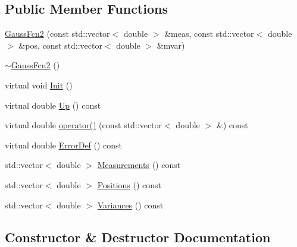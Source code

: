 \subsection*{Public Member Functions}
\begin{DoxyCompactItemize}
\item 
\mbox{\hyperlink{classROOT_1_1Minuit2_1_1GaussFcn2_a2904a79650d89e25591d84060e986271}{Gauss\+Fcn2}} (const std\+::vector$<$ double $>$ \&meas, const std\+::vector$<$ double $>$ \&pos, const std\+::vector$<$ double $>$ \&mvar)
\item 
\mbox{\hyperlink{classROOT_1_1Minuit2_1_1GaussFcn2_ab37a15b9986eab678018570c2a744799}{$\sim$\+Gauss\+Fcn2}} ()
\item 
virtual void \mbox{\hyperlink{classROOT_1_1Minuit2_1_1GaussFcn2_a4094daab77c76f30bacb299c5c3dfba4}{Init}} ()
\item 
virtual double \mbox{\hyperlink{classROOT_1_1Minuit2_1_1GaussFcn2_aef7172f9af50244bc9fce0c96cc21e81}{Up}} () const
\item 
virtual double \mbox{\hyperlink{classROOT_1_1Minuit2_1_1GaussFcn2_ad90e2fe9c9a2392c1e110a3e4679bfc3}{operator()}} (const std\+::vector$<$ double $>$ \&) const
\item 
virtual double \mbox{\hyperlink{classROOT_1_1Minuit2_1_1GaussFcn2_ac240f7b6ecbb7bf842d786e3914c620a}{Error\+Def}} () const
\item 
std\+::vector$<$ double $>$ \mbox{\hyperlink{classROOT_1_1Minuit2_1_1GaussFcn2_acd862030b2db540b0a7210e78c2f913f}{Measurements}} () const
\item 
std\+::vector$<$ double $>$ \mbox{\hyperlink{classROOT_1_1Minuit2_1_1GaussFcn2_a11faaa08de303ea203403c320c9e1f0a}{Positions}} () const
\item 
std\+::vector$<$ double $>$ \mbox{\hyperlink{classROOT_1_1Minuit2_1_1GaussFcn2_ae14a0349f83e8ffe7b2b1cda4e138113}{Variances}} () const
\end{DoxyCompactItemize}


\subsection{Constructor \& Destructor Documentation}
\mbox{\label{classROOT_1_1Minuit2_1_1GaussFcn2_a2904a79650d89e25591d84060e986271}} 
